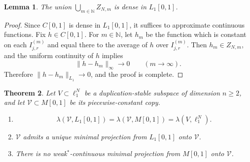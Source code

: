 \documentclass[11pt]{amsart}
\numberwithin{equation}{section}
\newtheorem{theorem}{Theorem}[section]
\newtheorem{lemma}[theorem]{Lemma}
\theoremstyle{definition}
\theoremstyle{remark}
\newcommand{\N}{\mathbb N}
\begin{document}
\begin{lemma}
\label{lem:ZNm-dense}
The union $\bigcup_{m\in\N} Z_{N,m}$ is dense in $L_1[0,1]$.
\end{lemma}

\begin{proof}
Since $C[0,1]$ is dense in $L_1[0,1]$, it suffices to approximate continuous functions. Fix $h\in C[0,1]$. For $m\in\N$, let $h_m$ be the function which is constant on each $I_{j,r}^{(m)}$ and equal there to the average of $h$ over $I_{j,r}^{(m)}$. Then $h_m\in Z_{N,m}$, and the uniform continuity of $h$ implies
\[
\|h-h_m\|_\infty \to 0
\qquad (m\to\infty).
\]
Therefore $\|h-h_m\|_{L_1}\to 0$, and the proof is complete.
\end{proof}

\begin{theorem}
\label{thm:piecewise-main}
Let $V\subset \ell_1^N$ be a duplication-stable subspace of dimension $n\geqslant 2$, and let $\mathscr V\subset M[0,1]$ be its piecewise-constant copy.

\begin{enumerate}[label=\textup{(\roman*)}]
\item
\[
\lambda(\mathscr V,L_1[0,1]) = \lambda(\mathscr V,M[0,1]) = \lambda(V,\ell_1^N).
\]
\item $\mathscr V$ admits a unique minimal projection from $L_1[0,1]$ onto $\mathscr V$.
\item There is no weak$^*$-continuous minimal projection from $M[0,1]$ onto $\mathscr V$.
\end{enumerate}
\end{theorem}
\end{document}
